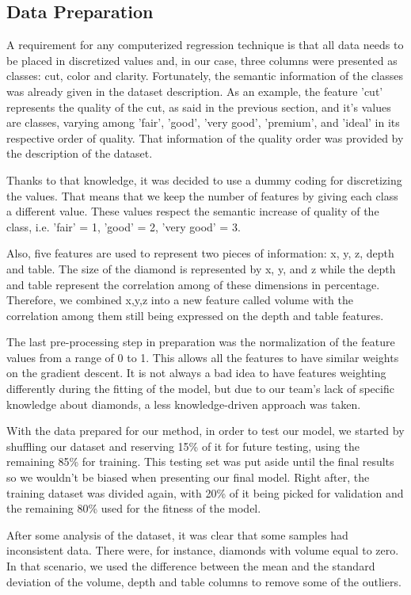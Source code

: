\documentclass[conference]{IEEEtran}
\begin{document}
\subsection{Data Preparation}	
    A requirement for any computerized regression technique is that all data needs to be placed in discretized values and, in our case, three columns were presented as classes: cut, color and clarity. Fortunately, the semantic information of the classes was already given in the dataset description. As an example, the feature 'cut' represents the quality of the cut, as said in the previous section, and it's values are classes, varying among 'fair', 'good', 'very good', 'premium', and 'ideal' in its respective order of quality. That information of the quality order was provided by the description of the dataset.
    
    Thanks to that knowledge, it was decided to use a dummy coding for discretizing the values. That means that we keep the number of features by giving each class a different value. These values respect the semantic increase of quality of the class, i.e. 'fair' = 1, 'good' = 2, 'very good' = 3.
    
    Also, five features are used to represent two pieces of information: x, y, z, depth and table. The size of the diamond is represented by x, y, and z while the depth and table represent the correlation among of these dimensions in percentage. Therefore, we combined x,y,z into a new feature called volume with the correlation among them still being expressed on the depth and table features.
    
    The last pre-processing step in preparation was the normalization of the feature values from a range of 0 to 1. This allows all the features to have similar weights on the gradient descent. It is not always a bad idea to have features weighting differently during the fitting of the model, but due to our team's lack of specific knowledge about diamonds, a less knowledge-driven approach was taken.
    
    With the data prepared for our method, in order to test our model, we started by shuffling our dataset and reserving 15\% of it for future testing, using the remaining 85\% for training. This testing set was put aside until the final results so we wouldn't be biased when presenting our final model. Right after, the training dataset was divided again, with 20\% of it being picked for validation and the remaining 80\% used for the fitness of the model.
    
    After some analysis of the dataset, it was clear that some samples had inconsistent data. There were, for instance, diamonds with volume equal to zero. In that scenario, we used the difference between the mean and the standard deviation of the volume, depth and table columns to remove some of the outliers.
    
\end{document}
